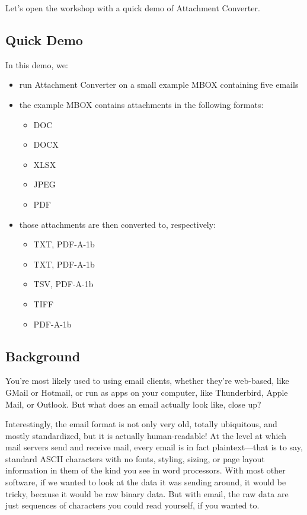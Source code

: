 \documentclass[11pt]{article}
\begin{document}
Let's open the workshop with a quick demo of Attachment Converter.

\subsection{Quick Demo}
\label{sec:org1d73c6b}

In this demo, we:

\begin{itemize}
\item run Attachment Converter on a small example MBOX containing five
emails
\item the example MBOX contains attachments in the following formats:
\begin{itemize}
\item DOC
\item DOCX
\item XLSX
\item JPEG
\item PDF
\end{itemize}
\item those attachments are then converted to, respectively:
\begin{itemize}
\item TXT, PDF-A-1b
\item TXT, PDF-A-1b
\item TSV, PDF-A-1b
\item TIFF
\item PDF-A-1b
\end{itemize}
\end{itemize}

\subsection{Background}
\label{sec:orgff8905a}

You're most likely used to using email clients, whether they're
web-based, like GMail or Hotmail, or run as apps on your computer,
like Thunderbird, Apple Mail, or Outlook.  But what does an email
actually look like, close up?

Interestingly, the email format is not only very old, totally
ubiquitous, and mostly standardized, but it is actually
human-readable!  At the level at which mail servers send and receive
mail, every email is in fact plaintext---that is to say, standard
ASCII characters with no fonts, styling, sizing, or page layout
information in them of the kind you see in word processors.  With most
other software, if we wanted to look at the data it was sending
around, it would be tricky, because it would be raw binary data.  But
with email, the raw data are just sequences of characters you could
read yourself, if you wanted to.
\end{document}
